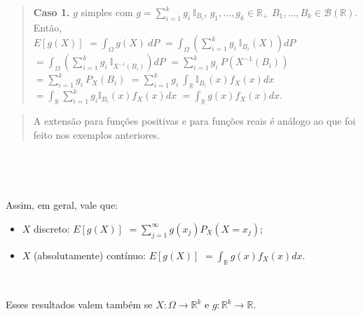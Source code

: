 \documentclass[
]{book}
\begin{document}
\begin{quote}
\textbf{Caso 1.} \(g\) simples com \(g = \displaystyle\sum_{i=1}^kg_i~\mathbb{I}_{B_i}\), \(g_1,\ldots,g_k \in \mathbb{R}_+\) \(B_1,\ldots,B_k \in \mathcal{B}(\mathbb{R})\). Então,\\
\(E\left[g(X)\right]\) \(=\displaystyle\int_\Omega g(X)~dP\)
\(=\displaystyle\int_\Omega\left(\sum_{i=1}^k g_i~\mathbb{I}_{B_i}(X)\right)dP\)
\(=\displaystyle\int_\Omega\left(\sum_{i=1}^k g_i~\mathbb{I}_{X^{-1}(B_i)}\right)dP\)
\(=\displaystyle\sum_{i=1}^k g_i~P(X^{-1}(B_i))\)
\(=\displaystyle\sum_{i=1}^k g_i~P_X(B_i)\)
\(=\displaystyle\sum_{i=1}^k g_i~\int_{\mathbb{R}}\mathbb{I}_{B_i}(x)f_X(x)dx\)
\(=\displaystyle\int_{\mathbb{R}}\sum_{i=1}^k g_i\mathbb{I}_{B_i}(x)f_X(x)dx\)
\(=\displaystyle\int_{\mathbb{R}}g(x)f_X(x)dx\).
\end{quote}

\begin{quote}
A extensão para funções positivas e para funções reais é análogo ao que foi feito nos exemplos anteriores.
\end{quote}

\(~\)

\(~\)

Assim, em geral, vale que:

\begin{itemize}
\item
  \(X\) discreto: \(E[g(X)]\) \(=\displaystyle\sum_{j=1}^\infty g(x_j)P_X(X=x_j)\);
\item
  \(X\) (absolutamente) contínuo: \(E[g(X)]\) \(=\displaystyle\int_{\mathbb{R}}g(x)f_X(x)dx\).
\end{itemize}

\(~\)

Esses resultados valem também se \(X: \Omega \longrightarrow \mathbb{R}^k\) e \(g: \mathbb{R}^k\longrightarrow \mathbb{R}.\)

\(~\)

\(~\)
\end{document}
